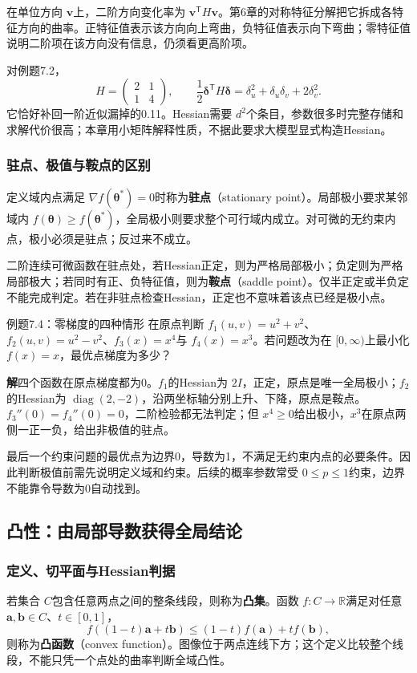 \documentclass[UTF8,fontset=none,zihao=-4,a4paper]{ctexart}
\newcommand{\term}[1]{\textbf{#1}}
\newcommand{\sol}{\par\noindent\textbf{解}\quad}
\numberwithin{equation}{section}
\numberwithin{figure}{section}
\begin{document}
在单位方向 $\symbf v$上，二阶方向变化率为 $\symbf v^{\mathsf T}H\symbf v$。第6章的对称特征分解把它拆成各特征方向的曲率。正特征值表示该方向向上弯曲，负特征值表示向下弯曲；零特征值说明二阶项在该方向没有信息，仍须看更高阶项。

对例题7.2，
\[
 H=\begin{pmatrix}2&1\\1&4\end{pmatrix},\qquad
 \frac12\symbf\delta^{\mathsf T}H\symbf\delta
 =\delta_u^2+\delta_u\delta_v+2\delta_v^2.
\]
它恰好补回一阶近似漏掉的0.11。Hessian需要 $d^2$个条目，参数很多时完整存储和求解代价很高；本章用小矩阵解释性质，不据此要求大模型显式构造Hessian。

\subsubsection{驻点、极值与鞍点的区别}
定义域内点满足 $\nabla f(\symbf\theta^*)=0$时称为\term{驻点}（stationary point）。局部极小要求某邻域内 $f(\symbf\theta)\ge f(\symbf\theta^*)$，全局极小则要求整个可行域内成立。对可微的无约束内点，极小必须是驻点；反过来不成立。

二阶连续可微函数在驻点处，若Hessian正定，则为严格局部极小；负定则为严格局部极大；若同时有正、负特征值，则为\term{鞍点}（saddle point）。仅半正定或半负定不能完成判定。若在非驻点检查Hessian，正定也不意味着该点已经是极小点。

\begin{infobox}{例题7.4：零梯度的四种情形}
在原点判断 $f_1(u,v)=u^2+v^2$、$f_2(u,v)=u^2-v^2$、$f_3(x)=x^4$与 $f_4(x)=x^3$。若问题改为在 $[0,\infty)$上最小化 $f(x)=x$，最优点梯度为多少？
\end{infobox}
\sol 四个函数在原点梯度都为0。$f_1$的Hessian为 $2I$，正定，原点是唯一全局极小；$f_2$的Hessian为 $\operatorname{diag}(2,-2)$，沿两坐标轴分别上升、下降，原点是鞍点。$f_3''(0)=f_4''(0)=0$，二阶检验都无法判定；但 $x^4\ge0$给出极小，$x^3$在原点两侧一正一负，给出非极值的驻点。

最后一个约束问题的最优点为边界0，导数为1，不满足无约束内点的必要条件。因此判断极值前需先说明定义域和约束。后续的概率参数常受 $0\le p\le1$约束，边界不能靠令导数为0自动找到。

\subsection{凸性：由局部导数获得全局结论}
\subsubsection{定义、切平面与Hessian判据}
若集合 $C$包含任意两点之间的整条线段，则称为\term{凸集}。函数 $f:C\to\mathbb R$满足对任意 $\symbf a,\symbf b\in C$、$t\in[0,1]$，
\[
 f((1-t)\symbf a+t\symbf b)
 \le(1-t)f(\symbf a)+tf(\symbf b),
\]
则称为\term{凸函数}（convex function）。图像位于两点连线下方；这个定义比较整个线段，不能只凭一个点处的曲率判断全域凸性。
\end{document}
